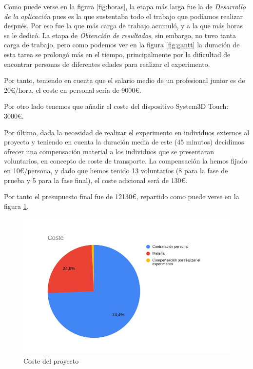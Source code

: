 \documentclass[a4paper,11pt, oneside]{book}
\begin{document}
Como puede verse en la figura \ref{fig:horas}, la etapa más larga fue la de \textit{Desarrollo de la aplicación} pues es la que sustentaba todo el trabajo que podíamos realizar después. Por eso fue la que más carga de trabajo acumuló, y a la que más horas se le dedicó. La etapa de \textit{Obtención de resultados}, sin embargo, no tuvo tanta carga de trabajo, pero como podemos ver en la figura \ref{fig:gantt} la duración de esta tarea se prolongó más en el tiempo, principalmente por la dificultad de encontrar personas de diferentes edades para realizar el experimento.


Por tanto, teniendo en cuenta que el salario medio de un profesional junior es de 20\euro /hora, el coste en personal seria de 9000\euro.

Por otro lado tenemos que añadir el coste del dispositivo System3D Touch: 3000\euro.

Por último, dada la necesidad de realizar el experimento en individuos externos al proyecto y teniendo en cuenta la duración media de este (45 minutos) decidimos ofrecer una compensación material a los individuos que se presentaran voluntarios, en concepto de coste de transporte. La compensación la hemos fijado en 10\euro /persona, y dado que hemos tenido 13 voluntarios (8 para la fase de prueba y 5 para la fase final), el coste adicional será de 130\euro.

Por tanto el presupuesto final fue de 12130\euro, repartido como puede verse en la figura \ref{fig:coste}.

\begin{figure}[H]
	
	\centering
	\includegraphics[width=\linewidth]{coste}
	\caption{Coste del proyecto}
	\label{fig:coste}
	
\end{figure}
\end{document}
